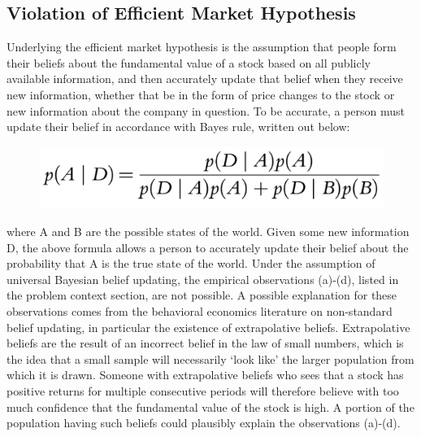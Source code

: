 \documentclass[10pt,twocolumn]{article}
\begin{document}
\subsection{Violation of Efficient Market Hypothesis}
Underlying the efficient market hypothesis is the assumption that people form their beliefs about the fundamental value of a stock based on all publicly available information, and then accurately update that belief when they receive new information, whether that be in the form of price changes to the stock or new information about the company in question. To be accurate, a person must update their belief in accordance with Bayes rule, written out below:
\begin{figure}[H]
    \centering
    \includegraphics[width=1\linewidth]{EMH1.png}
\end{figure}

\noindent where A and B are the possible states of the world. Given some new information D, the above formula allows a person to accurately update their belief about the probability that A is the true state of the world. Under the assumption of universal Bayesian belief updating, the empirical observations (a)-(d), listed in the problem context section, are not possible. A possible explanation for these observations comes from the behavioral economics literature on non-standard belief updating, in particular the existence of extrapolative beliefs. Extrapolative beliefs are the result of an incorrect belief in the law of small numbers, which is the idea that a small sample will necessarily ‘look like’ the larger population from which it is drawn. Someone with extrapolative beliefs who sees that a stock has positive returns for multiple consecutive periods will therefore believe with too much confidence that the fundamental value of the stock is high. A portion of the population having such beliefs could plausibly explain the observations (a)-(d).
\end{document}
